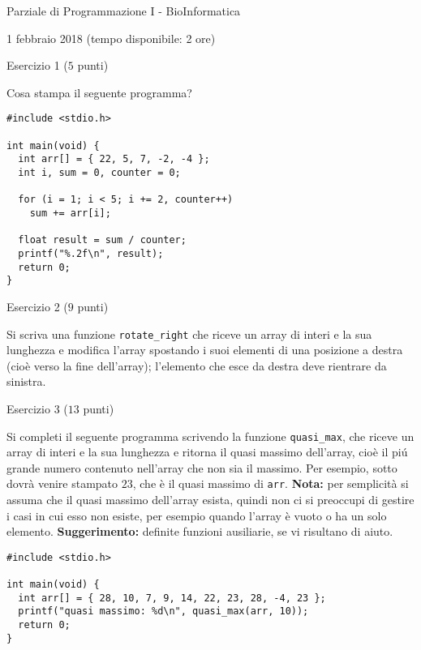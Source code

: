 \documentclass[12pt]{article}
\begin{document}
\begin{center}{\LARGE Parziale di Programmazione I - BioInformatica}\\
\vspace*{-2ex}
\begin{center}
  \large 1 febbraio 2018 (tempo disponibile: 2 ore)
\end{center}
\end{center}

\begin{center}{\Large Esercizio 1} ($5$ punti)
\end{center}

Cosa stampa il seguente programma?

\begin{lstlisting}
#include <stdio.h>

int main(void) {
  int arr[] = { 22, 5, 7, -2, -4 };
  int i, sum = 0, counter = 0;

  for (i = 1; i < 5; i += 2, counter++)
    sum += arr[i];

  float result = sum / counter;
  printf("%.2f\n", result);
  return 0;
}
\end{lstlisting}

\vspace*{1ex}
\begin{center}{\Large Esercizio 2} ($9$ punti)
\end{center}
Si scriva una funzione \texttt{rotate\_right} che riceve un array di interi e la sua lunghezza e modifica l'array spostando i suoi elementi di una posizione a destra (cio\`e verso la fine dell'array); l'elemento che esce da destra deve rientrare da sinistra.

\vspace*{1ex}
\begin{center}{\Large Esercizio 3} ($13$ punti)\end{center}
%
Si completi il seguente programma scrivendo la funzione
\texttt{quasi\_max}, che riceve un array di interi e la sua lunghezza
e ritorna il quasi massimo dell'array, cio\`e il pi\'u grande numero
contenuto nell'array che non sia il massimo. Per esempio, sotto
dovr\`a venire stampato $23$, che \`e il quasi massimo di \texttt{arr}.
\textbf{Nota:} per semplicit\`a
si assuma che il quasi massimo dell'array
esista, quindi non ci si preoccupi di gestire i casi in cui
esso non esiste, per esempio quando l'array \`e vuoto
o ha un solo elemento. \textbf{Suggerimento:} definite funzioni
ausiliarie, se vi risultano di aiuto.
%
\begin{lstlisting}
#include <stdio.h>

int main(void) {
  int arr[] = { 28, 10, 7, 9, 14, 22, 23, 28, -4, 23 };
  printf("quasi massimo: %d\n", quasi_max(arr, 10));
  return 0;
}
\end{lstlisting}
\end{document}
